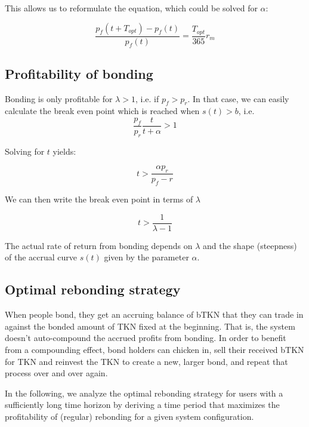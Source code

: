 \documentclass{article}
\begin{document}
This allows us to reformulate the equation, which could be solved for $\alpha$:

\begin{equation}
  \label{eq:yield-eq}
  \frac{p_f(t + T_{opt}) - p_f(t)}{p_f(t)} = \frac{T_{opt}}{365} r_m 
\end{equation}

\subsection{Profitability of bonding}
Bonding is only profitable for $\lambda>1$, i.e. if $p_f>p_r$. In that case, we can easily calculate the break even point which is reached when $s(t)>b$, i.e.
\begin{equation}
  \label{eq:break_even_0}
\frac{p_f}{p_r}\frac{t}{t+\alpha} > 1
\end{equation}

Solving for $t$ yields:

\begin{equation}
  \label{eq:break_even_1}
t > \frac{\alpha p_r}{p_f-r}
\end{equation}

We can then write the break even point in terms of $\lambda$

\begin{equation}
  \label{eq:break_even_2}
t > \frac{1}{\lambda-1}
\end{equation}

The actual rate of return from bonding depends on $\lambda$ and the shape (steepness) of the accrual curve $s(t)$ given by the parameter $\alpha$.

\subsection{Optimal rebonding strategy}
When people bond, they get an accruing balance of bTKN that they can trade in against the bonded amount of TKN fixed at the beginning. That is, the system doesn't auto-compound the accrued profits from bonding. In order to benefit from a compounding effect, bond holders can chicken in, sell their received bTKN for TKN and reinvest the TKN to create a new, larger bond, and repeat that process over and over again.

In the following, we analyze the optimal rebonding strategy for users with a sufficiently long time horizon by deriving a time period that maximizes the profitability of (regular) rebonding for a given system configuration.
\end{document}
